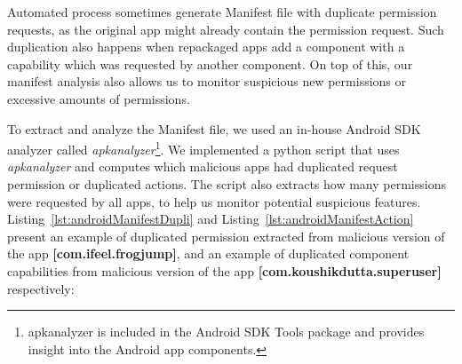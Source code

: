 
Automated process sometimes generate Manifest file with duplicate permission requests, as the original app might already contain the permission request. Such duplication also happens when repackaged apps add a component with a capability which was requested by another component. On top of this, our manifest analysis also allows us to monitor suspicious new permissions or excessive amounts of permissions. 

To extract and analyze the Manifest file, we used an in-house Android SDK analyzer called \textit{apkanalyzer}\footnote{apkanalyzer is included in the Android SDK Tools package and provides insight into the Android app components.}. We implemented a python script that uses \textit{apkanalyzer} and computes which malicious apps had duplicated request permission or duplicated actions. The script also extracts how many permissions were requested by all apps, to help us monitor potential suspicious features. Listing~\ref{lst:androidManifestDupli} and Listing~\ref{lst:androidManifestAction} present an example of duplicated permission extracted from malicious version of the app \textbf{[com.ifeel.frogjump]}, and an example of duplicated component capabilities from malicious version of the app \textbf{[com.koushikdutta.superuser]} respectively:


